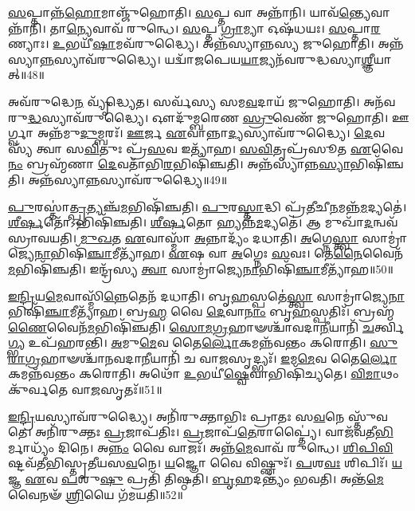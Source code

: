 \-\ul{𑌸}\-𑌪𑍍𑌤𑌾𑌨𑍍𑌨᳴\-\ul{𑌹𑍋}\-𑌮𑌾𑌞𑍍𑌜𑍁᳴𑌹𑍋𑌤𑌿।
\-\ul{𑌸}\-𑌪𑍍𑌤 𑌵𑌾 𑌅𑌨𑍍𑌨𑌾᳴𑌨𑌿।
𑌯𑌾𑌵᳴\-\ul{𑌨𑍍𑌤𑍍𑌯𑍇}\-𑌵𑌾𑌨𑍍𑌨𑌾᳴𑌨𑌿।
𑌤𑌾\-\ul{𑌨𑍍𑌯𑍇}\-𑌵𑌾𑌵᳴ 𑌰𑍁𑌨𑍍𑌧𑍇।
\-\ul{𑌸}\-𑌪𑍍𑌤 \ul{𑌗𑍍𑌰𑌾}\-𑌮𑍍𑌯𑌾 𑌓𑌷᳴𑌧𑌯𑌃।
\-\ul{𑌸}\-𑌪𑍍𑌤𑌾\-\ul{𑌰}\-𑌣𑍍𑌯𑌾𑌃।
\-\ul{𑌉}\-𑌭𑌯𑍀᳴\-\ul{𑌷𑌾}\-𑌮𑌵᳴𑌰𑍁𑌦𑍍𑌧𑍍𑌯𑍈।
𑌅𑌨𑍍𑌨᳴𑌸𑍍𑌯𑌾𑌨𑍍𑌨𑌸𑍍𑌯 𑌜𑍁𑌹𑍋𑌤𑌿।
𑌅𑌨𑍍𑌨᳴𑌸𑍍𑌯𑌾\-\ul{𑌨𑍍𑌨}\-𑌸𑍍𑌯𑌾\-𑌵᳴𑌰𑍁𑌦𑍍𑌧𑍍𑌯𑍈।
𑌯𑌦𑍍𑌵𑌾᳴𑌜𑌪𑍇𑌯\-\ul{𑌯𑌾}\-𑌜𑍍𑌯𑌨᳴𑌵𑌰𑍁𑌦𑍍𑌧𑌸𑍍𑌯𑌾\-\ul{𑌶𑍍𑌞𑍀}\-𑌯𑌾𑌤𑍍॥48॥

𑌅𑌵᳴𑌰𑍁𑌦𑍍𑌧𑍇\-\ul{𑌨} 𑌵𑍍𑌯𑍃᳴𑌦𑍍𑌧𑍍𑌯𑍇𑌤।
𑌸𑌰𑍍𑌵᳴𑌸𑍍𑌯 𑌸𑌮\-\ul{𑌵}\-𑌦𑌾𑌯᳴ 𑌜𑍁𑌹𑍋𑌤𑌿।
𑌅𑌨᳴𑌵𑌰𑍁\-\ul{𑌦𑍍𑌧}\-𑌸𑍍𑌯𑌾𑌵᳴𑌰𑍁𑌦𑍍𑌧𑍍𑌯𑍈।
𑌔𑌦𑍁᳴𑌮𑍍𑌬𑌰𑍇𑌣 \ul{𑌸𑍍𑌰𑍁}\-𑌵𑍇𑌣᳴ 𑌜𑍁𑌹𑍋𑌤𑌿।
𑌊𑌰𑍍𑌗𑍍𑌵𑌾 𑌅𑌨𑍍𑌨᳴𑌮𑍁\-\ul{𑌦𑍁}\-𑌮𑍍𑌬𑌰𑌃᳴।
\-\ul{𑌊}\-𑌰𑍍𑌜 \ul{𑌏}\-𑌵𑌾𑌨𑍍𑌨𑌾\-\ul{𑌦𑍍𑌯}\-𑌸𑍍𑌯𑌾𑌵᳴𑌰𑍁𑌦𑍍𑌧𑍍𑌯𑍈।
\-\ul{𑌦𑍇}\-𑌵𑌸𑍍𑌯᳴ 𑌤𑍍𑌵𑌾 𑌸\-\ul{𑌵𑌿}\-𑌤𑍁𑌃 𑌪𑍍𑌰᳴\-\ul{𑌸}\-𑌵 𑌇𑌤𑍍𑌯𑌾᳴𑌹।
\-\ul{𑌸}\-\-\ul{𑌵𑌿}\-𑌤𑍃𑌪𑍍𑌰᳴𑌸𑍂𑌤 \ul{𑌏}\-𑌵𑍈\-\ul{𑌨𑌂} 𑌬𑍍𑌰𑌹𑍍𑌮᳴𑌣𑌾 \ul{𑌦𑍇}\-𑌵𑌤𑌾᳴𑌭𑌿\-\ul{𑌰}\-𑌭𑌿𑌷𑌿᳴𑌞𑍍𑌚𑌤𑌿।
𑌅𑌨𑍍𑌨᳴𑌸𑍍𑌯𑌾𑌨𑍍𑌨\-\ul{𑌸𑍍𑌯𑌾}\-𑌭𑌿𑌷𑌿᳴𑌞𑍍𑌚𑌤𑌿।
𑌅𑌨𑍍𑌨᳴𑌸𑍍𑌯𑌾\-\ul{𑌨𑍍𑌨}\-𑌸𑍍𑌯𑌾𑌵᳴𑌰𑍁𑌦𑍍𑌧𑍍𑌯𑍈॥49॥

\-\ul{𑌪𑍁}\-𑌰𑌸𑍍𑌤𑌾॑\-\ul{𑌤𑍍𑌪𑍍𑌰}\-𑌤𑍍𑌯𑌞𑍍𑌚᳴\-\ul{𑌮}\-𑌭𑌿𑌷𑌿᳴𑌞𑍍𑌚𑌤𑌿।
\-\ul{𑌪𑍁}\-𑌰\-\ul{𑌸𑍍𑌤𑌾}\-𑌦𑍍𑌧𑌿 𑌪𑍍𑌰᳴\-\ul{𑌤𑍀}\-𑌚𑍀\-\ul{𑌨}\-𑌮𑌨𑍍𑌨᳴\-\ul{𑌮}\-𑌦𑍍𑌯𑌤𑍇॑।
\-\ul{𑌶𑍀}\-\-\ul{𑌰𑍍}\-\-\ul{𑌷}\-𑌤𑍋᳴\-𑌽𑌭𑌿𑌷𑌿᳴𑌞𑍍𑌚𑌤𑌿।
\-\ul{𑌶𑍀}\-\-\ul{𑌰𑍍}\-\-\ul{𑌷}\-𑌤𑍋 𑌹𑍍𑌯𑌨𑍍𑌨᳴\-\ul{𑌮}\-𑌦𑍍𑌯𑌤𑍇॑।
𑌆 𑌮𑍁𑌖𑌾᳴\-\ul{𑌦}\-𑌨𑍍𑌵𑌵᳴\-𑌸𑍍𑌰𑌾𑌵𑌯𑌤𑌿।
\-\ul{𑌮𑍁}\-\-\ul{𑌖}\-𑌤 \ul{𑌏}\-𑌵𑌾𑌸𑍍𑌮𑌾᳴ \ul{𑌅}\-𑌨𑍍𑌨𑌾𑌦𑍍𑌯𑌂᳴ 𑌦𑌧𑌾𑌤𑌿।
\-\ul{𑌅}\-𑌗𑍍𑌨𑍇\-\ul{𑌸𑍍𑌤𑍍𑌵𑌾} 𑌸𑌾𑌮𑍍𑌰𑌾॑𑌜𑍍𑌯𑍇\-\ul{𑌨𑌾}\-\-𑌭𑌿𑌷𑌿᳴\-\ul{𑌞𑍍𑌚𑌾}\-𑌮𑍀\-𑌤𑍍𑌯𑌾᳴𑌹।
\-\ul{𑌏}\-𑌷 𑌵𑌾 \ul{𑌅}\-𑌗𑍍𑌨𑍇𑌃 \ul{𑌸}\-𑌵𑌃।
𑌤𑍇\-\ul{𑌨𑍈}\-𑌵𑍈𑌨᳴\-\ul{𑌮}\-𑌭𑌿\-𑌷𑌿᳴𑌞𑍍𑌚𑌤𑌿।
𑌇𑌨𑍍𑌦𑍍𑌰᳴𑌸𑍍𑌯 \ul{𑌤𑍍𑌵𑌾} 𑌸𑌾𑌮𑍍𑌰𑌾॑𑌜𑍍𑌯𑍇\-\ul{𑌨𑌾}\-\-𑌭𑌿𑌷𑌿᳴\-\ul{𑌞𑍍𑌚𑌾}\-𑌮𑍀\-𑌤𑍍𑌯𑌾᳴𑌹॥50॥

\-\ul{𑌇}\-\-\ul{𑌨𑍍𑌦𑍍𑌰𑌿}\-𑌯\-\ul{𑌮𑍇}\-𑌵𑌾𑌸𑍍𑌮𑌿᳴\-\ul{𑌨𑍍𑌨𑍇}\-𑌤𑍇𑌨᳴ 𑌦𑌧𑌾𑌤𑌿।
𑌬𑍃\-\ul{𑌹}\-𑌸𑍍𑌪𑌤𑍇॑\-\ul{𑌸𑍍𑌤𑍍𑌵𑌾} 𑌸𑌾𑌮𑍍𑌰𑌾॑𑌜𑍍𑌯𑍇\-\ul{𑌨𑌾}\-𑌭𑌿\-𑌷𑌿᳴\-\ul{𑌞𑍍𑌚𑌾}\-𑌮𑍀𑌤𑍍𑌯𑌾᳴𑌹।
𑌬𑍍𑌰\-\ul{𑌹𑍍𑌮} 𑌵𑍈 \ul{𑌦𑍇}\-𑌵𑌾\-\ul{𑌨𑌾𑌂} 𑌬𑍃\-\ul{𑌹}\-𑌸𑍍𑌪𑌤𑌿𑌃᳴।
𑌬𑍍𑌰𑌹𑍍𑌮᳴\-\ul{𑌣𑍈}\-𑌵𑍈𑌨᳴\-\ul{𑌮}\-𑌭𑌿\-𑌷𑌿᳴𑌞𑍍𑌚𑌤𑌿।
\-\ul{𑌸𑍋}\-\-\ul{𑌮}\-\-\ul{𑌗𑍍𑌰}\-𑌹𑌾𑍟𑌶𑍍𑌚𑌾᳴𑌵𑌦𑌾\-\ul{𑌨𑍀}\-𑌯𑌾𑌨𑌿᳴ \ul{𑌚}\-𑌰𑍍𑌤𑍍𑌵𑌿\-\ul{𑌗𑍍𑌭𑍍𑌯} 𑌉𑌪᳴𑌹𑌰𑌨𑍍𑌤𑌿।
\-\ul{𑌅}\-𑌮𑍁\-\ul{𑌮𑍇}\-𑌵 𑌤𑍈\-\ul{𑌰𑍍𑌲𑍋}\-𑌕𑌮𑌨𑍍𑌨᳴𑌵𑌨𑍍𑌤𑌂 𑌕𑌰𑍋𑌤𑌿।
\-\ul{𑌸𑍁}\-\-\ul{𑌰𑌾}\-\-\ul{𑌗𑍍𑌰}\-𑌹𑌾𑍟𑌶𑍍𑌚𑌾᳴𑌨𑌵𑌦𑌾\-\ul{𑌨𑍀}\-\-𑌯𑌾𑌨𑌿᳴ 𑌚 𑌵𑌾\-\ul{𑌜}\-𑌸𑍃𑌦𑍍𑌭𑍍𑌯𑌃᳴।
\-\ul{𑌇}\-𑌮\-\ul{𑌮𑍇}\-𑌵 𑌤𑍈\-\ul{𑌰𑍍𑌲𑍋}\-𑌕𑌮𑌨𑍍𑌨᳴𑌵𑌨𑍍𑌤𑌂 𑌕𑌰𑍋𑌤𑌿।
𑌅𑌥𑍋᳴ \ul{𑌉}\-𑌭𑌯𑍀॑\-\ul{𑌷𑍍𑌵𑍇}\-𑌵𑌾𑌭𑌿𑌷𑌿᳴𑌚𑍍𑌯𑌤𑍇।
\-\ul{𑌵𑌿}\-\-\ul{𑌮𑌾}\-𑌥𑌂 𑌕𑍁᳴𑌰𑍍𑌵𑌤𑍇 𑌵𑌾\-\ul{𑌜}\-𑌸𑍃𑌤𑌃᳴॥51॥

\-\ul{𑌇}\-\-\ul{𑌨𑍍𑌦𑍍𑌰𑌿}\-𑌯𑌸𑍍𑌯𑌾𑌵᳴𑌰𑍁𑌦𑍍𑌧𑍍𑌯𑍈।
𑌅𑌨𑌿᳴𑌰𑍁𑌕𑍍𑌤𑌾𑌭𑌿𑌃 𑌪𑍍𑌰𑌾𑌤𑌃 𑌸\-\ul{𑌵}\-𑌨𑍇 𑌸𑍍𑌤𑍁᳴𑌵𑌤𑍇।
𑌅𑌨𑌿᳴𑌰𑍁𑌕𑍍𑌤𑌃 \ul{𑌪𑍍𑌰}\-𑌜𑌾\-𑌪᳴𑌤𑌿𑌃।
\-\ul{𑌪𑍍𑌰}\-𑌜𑌾𑌪᳴\-\ul{𑌤𑍇}\-𑌰𑌾𑌪𑍍𑌤𑍍𑌯𑍈॑।
𑌵𑌾𑌜᳴𑌵𑌤𑍀\-\ul{𑌭𑌿}\-𑌰𑍍𑌮𑌾𑌧𑍍𑌯𑌂᳴ 𑌦𑌿𑌨𑍇।
𑌅\-\ul{𑌨𑍍𑌨𑌂} 𑌵𑍈 𑌵𑌾𑌜𑌃᳴।
𑌅𑌨𑍍𑌨᳴\-\ul{𑌮𑍇}\-𑌵𑌾𑌵᳴ 𑌰𑍁𑌨𑍍𑌧𑍇।
\-\ul{𑌶𑌿}\-\-\ul{𑌪𑌿}\-\-\ul{𑌵𑌿}\-𑌷𑍍𑌟\-𑌵᳴𑌤𑍀𑌭𑌿𑌸𑍍𑌤𑍃𑌤𑍀𑌯𑌸\-\ul{𑌵}\-𑌨𑍇।
\-\ul{𑌯}\-𑌜𑍍𑌞𑍋 𑌵𑍈 𑌵𑌿𑌷𑍍𑌣𑍁𑌃᳴।
\-\ul{𑌪}\-𑌶\-\ul{𑌵𑌃} 𑌶𑌿𑌪𑌿𑌃᳴।
\-\ul{𑌯}\-𑌜𑍍𑌞 \ul{𑌏}\-𑌵 \ul{𑌪}\-𑌶𑍁\-\ul{𑌷𑍁} 𑌪𑍍𑌰𑌤𑌿᳴ 𑌤𑌿𑌷𑍍𑌠𑌤𑌿।
\-\ul{𑌬𑍃}\-𑌹𑌦𑌨𑍍𑌤𑍍𑌯𑌂᳴ 𑌭𑌵𑌤𑌿।
𑌅𑌨𑍍𑌤᳴\-\ul{𑌮𑍇}\-𑌵𑍈𑌨𑍟᳴ \ul{𑌶𑍍𑌰𑌿}\-𑌯𑍈 𑌗᳴𑌮𑌯𑌤𑌿॥52॥\anuvakamend[\-\ul{𑌅}\-\-\ul{𑌶𑍍𑌞𑍀}\-𑌯𑌾𑌦𑌨𑍍𑌨᳴𑌸𑍍𑌯𑌾\-\ul{𑌨𑍍𑌨}\-𑌸𑍍𑌯𑌾𑌵᳴𑌰𑍁\-\ul{𑌦𑍍𑌧𑍍𑌯𑌾} 𑌇𑌨𑍍𑌦𑍍𑌰᳴𑌸𑍍𑌯 \ul{𑌤𑍍𑌵𑌾} 𑌸𑌾𑌮𑍍𑌰𑌾॑𑌜𑍍𑌯𑍇\-\ul{𑌨𑌾}\-𑌭𑌿𑌷𑌿᳴\-\ul{𑌞𑍍𑌚𑌾}\-𑌮𑍀𑌤𑍍𑌯𑌾᳴𑌹 𑌵𑌾\-\ul{𑌜}\-𑌸𑍃\-\ul{𑌤𑌃} 𑌶𑌿\-\ul{𑌪𑌿}\-𑌸𑍍𑌤𑍍𑌰𑍀𑌣𑌿᳴ 𑌚]

